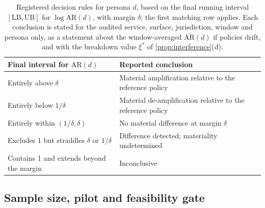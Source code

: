 \begin{table}[tbp]
\centering
\caption{Registered decision rules for persona $d$, based on the final running interval $[\mathrm{LB},\mathrm{UB}]$ for $\log\mathrm{AR}(d)$, with margin $\delta$; the first matching row applies. Each conclusion is stated for the audited service, surface, jurisdiction, window and persona only, as a statement about the window-averaged $\overline{\mathrm{AR}}(d)$ if policies drift, and with the breakdown value $\xi^\ast$ of \cref{prop:interference}(d).}\label{tab:prot-decisions}
\footnotesize
\renewcommand{\arraystretch}{1.15}
\begin{tabularx}{\textwidth}{@{}>{\raggedright\arraybackslash}p{5.2cm}>{\raggedright\arraybackslash}X@{}}
\toprule
Final interval for $\mathrm{AR}(d)$ & Reported conclusion \\
\midrule
Entirely above $\delta$ & Material amplification relative to the reference policy \\
Entirely below $1/\delta$ & Material de-amplification relative to the reference policy \\
Entirely within $(1/\delta,\delta)$ & No material difference at margin $\delta$ \\
Excludes 1 but straddles $\delta$ or $1/\delta$ & Difference detected; materiality undetermined \\
Contains 1 and extends beyond the margin & Inconclusive \\
\bottomrule
\end{tabularx}
\end{table}

\subsection{Sample size, pilot and feasibility gate}\label{sec:prot-power}

